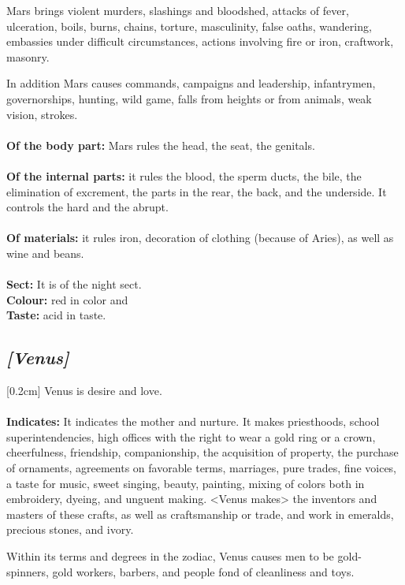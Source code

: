 Mars brings violent murders, slashings and bloodshed, attacks of fever, ulceration, boils, burns, chains, torture, masculinity, false oaths, wandering, embassies under difficult
circumstances, actions involving fire or iron, craftwork, masonry. 

In addition Mars causes commands, campaigns and leadership, infantrymen, governorships, hunting, wild game, falls from heights or from animals, weak vision, strokes. \\
\\
\textbf{Of the body part:} Mars rules the head, the seat, the genitals. \\
\\
\textbf{Of the internal parts:} it rules the blood, the sperm ducts, the bile, the elimination of excrement, the parts in the rear, the back, and the underside. It controls the hard and the abrupt. \\
\\
\textbf{Of materials:} it rules iron, decoration of clothing (because of Aries), as well as wine and beans. \\
\\
\textbf{Sect:} It is of the night sect. \\
\textbf{Colour:} red in color and \\
\textbf{Taste:} acid in taste.

\secbr
\subsection{\textit{[Venus]}}
[0.2cm]
 Venus is desire and love. \\
\\
\textbf{Indicates:} It indicates the mother and nurture. It makes priesthoods, school superintendencies, high offices with the right to wear a gold ring or a crown, cheerfulness, friendship, companionship, the acquisition of property, the purchase of ornaments, agreements on favorable terms, marriages, pure trades, fine voices, a taste for music, sweet singing, beauty, painting, mixing of colors both in embroidery, dyeing, and unguent making. <Venus makes> the inventors and masters of these crafts, as well as craftsmanship or trade, and work in emeralds, precious stones, and ivory. 

\mndl[0.2cm]
Within its terms and degrees in the zodiac, Venus causes men to be gold-spinners, gold workers, barbers, and people fond of cleanliness and toys. 


